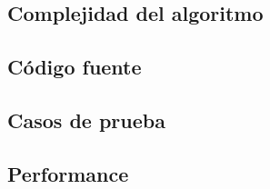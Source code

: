 \subsection{Complejidad del algoritmo}

\subsection{C\'odigo fuente}

\subsection{Casos de prueba}

\subsection{Performance}
